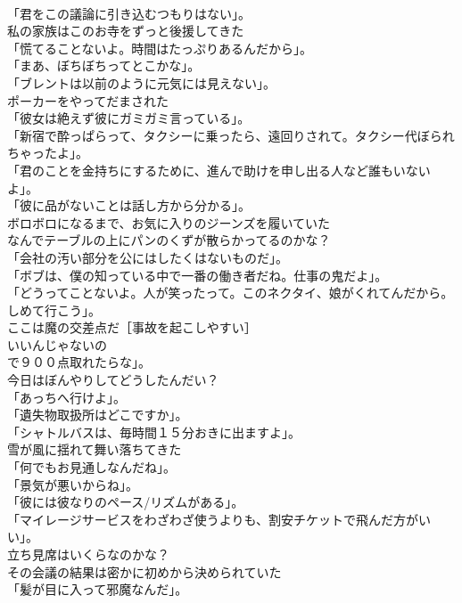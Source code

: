\documentclass[8pt]{extreport}
\begin{document}
\begin{CJK}{UTF8}{min}
\\	「君をこの議論に引き込むつもりはない」。	
\\	私の家族はこのお寺をずっと後援してきた	
\\	「慌てることないよ。時間はたっぷりあるんだから」。	
\\	「まあ、ぼちぼちってとこかな」。	
\\	「ブレントは以前のように元気には見えない」。	
\\	ポーカーをやってだまされた	
\\	「彼女は絶えず彼にガミガミ言っている」。	
\\	「新宿で酔っぱらって、タクシーに乗ったら、遠回りされて。タクシー代ぼられちゃったよ」。	
\\	「君のことを金持ちにするために、進んで助けを申し出る人など誰もいないよ」。	
\\	「彼に品がないことは話し方から分かる」。	
\\	ボロボロになるまで、お気に入りのジーンズを履いていた	
\\	なんでテーブルの上にパンのくずが散らかってるのかな？	
\\	「会社の汚い部分を公にはしたくはないものだ」。	
\\	「ボブは、僕の知っている中で一番の働き者だね。仕事の鬼だよ」。	
\\	「どうってことないよ。人が笑ったって。このネクタイ、娘がくれてんだから。しめて行こう」。	
\\	ここは魔の交差点だ［事故を起こしやすい］	
\\	いいんじゃないの	
\\	で９００点取れたらな」。	
\\	今日はぼんやりしてどうしたんだい？	
\\	「あっちへ行けよ」。 
\\	「遺失物取扱所はどこですか」。	
\\	「シャトルバスは、毎時間１５分おきに出ますよ」。	
\\	雪が風に揺れて舞い落ちてきた	
\\	「何でもお見通しなんだね」。	
\\	「景気が悪いからね」。	
\\	「彼には彼なりのペース/リズムがある」。	
\\	「マイレージサービスをわざわざ使うよりも、割安チケットで飛んだ方がいい」。	
\\	立ち見席はいくらなのかな？	
\\	その会議の結果は密かに初めから決められていた	
\\	「髪が目に入って邪魔なんだ」。	

\end{CJK}
\end{document}
